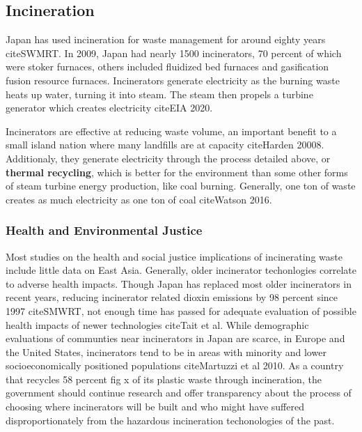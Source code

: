 \documentclass{book}\usepackage{knitr}
\begin{document}
\subsection{Incineration}

Japan has used incineration for waste management for around eighty years citeSWMRT. In 2009, Japan had nearly 1500 incinerators, 70 percent of which were stoker furnaces, others included fluidized bed furnaces and gasification fusion resource furnaces. Incinerators generate electricity as the burning waste heats up water, turning it into steam. The steam then propels a turbine generator which creates electricity citeEIA 2020.

Incinerators are effective at reducing waste volume, an important benefit to a small island nation where many landfills are at capacity citeHarden 20008. Additionaly, they generate electricity through the process detailed above, or \textbf{thermal recycling}, which is better for the environment than some other forms of steam turbine energy production, like coal burning. Generally, one ton of waste creates as much electricity as one ton of coal citeWatson 2016. 

\subsubsection{Health and Environmental Justice}

Most studies on the health and social justice implications of incinerating waste include little data on East Asia. Generally,  older incinerator techonlogies correlate to adverse health impacts. Though Japan has replaced most older incinerators in recent years, reducing incinerator related dioxin emissions by 98 percent since 1997 citeSMWRT, not enough time has passed for adequate evaluation of possible health impacts of newer technologies citeTait et al. While demographic evaluations of communties near incinerators in Japan are scarce, in Europe and the United States, incinerators tend to be in areas with minority and lower socioeconomically positioned populations citeMartuzzi et al 2010. As a country that recycles 58 percent fig x of its plastic waste through incineration, the government should continue research and offer transparency about the process of choosing where incinerators will be built and who might have suffered disproportionately from the hazardous incineration techonologies of the past. 
\end{document}
